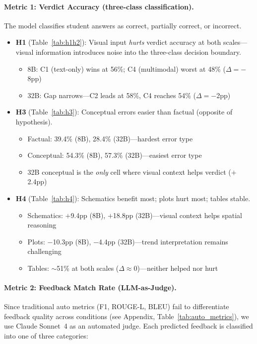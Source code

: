 \documentclass{article} %
\begin{document}
\paragraph{Metric 1: Verdict Accuracy (three-class classification).}
The model classifies student answers as correct, partially correct, or incorrect.

\begin{itemize}[itemsep=2pt, topsep=2pt]
    \item \textbf{H1} (Table~\ref{tab:h1h2}): Visual input \textit{hurts} verdict accuracy at both scales---visual information introduces noise into the three-class decision boundary.
    \begin{itemize}[itemsep=1pt, topsep=1pt]
        \item 8B: C1 (text-only) wins at 56\%; C4 (multimodal) worst at 48\% ($\Delta{=}-$8pp)
        \item 32B: Gap narrows---C2 leads at 58\%, C4 reaches 54\% ($\Delta{=}-$2pp)
    \end{itemize}
    \item \textbf{H3} (Table~\ref{tab:h3}): Conceptual errors easier than factual (opposite of hypothesis).
    \begin{itemize}[itemsep=1pt, topsep=1pt]
        \item Factual: 39.4\% (8B), 28.4\% (32B)---hardest error type
        \item Conceptual: 54.3\% (8B), 57.3\% (32B)---easiest error type
        \item 32B conceptual is the \textit{only} cell where visual context helps verdict ($+$2.4pp)
    \end{itemize}
    \item \textbf{H4} (Table~\ref{tab:h4}): Schematics benefit most; plots hurt most; tables stable.
    \begin{itemize}[itemsep=1pt, topsep=1pt]
        \item Schematics: $+$9.4pp (8B), $+$18.8pp (32B)---visual context helps spatial reasoning
        \item Plots: $-$10.3pp (8B), $-$4.4pp (32B)---trend interpretation remains challenging
        \item Tables: ${\sim}$51\% at both scales ($\Delta{\approx}$0)---neither helped nor hurt
    \end{itemize}
\end{itemize}

\paragraph{Metric 2: Feedback Match Rate (LLM-as-Judge).}
Since traditional auto metrics (F1, ROUGE-L, BLEU) fail to differentiate feedback quality across conditions (see Appendix, Table~\ref{tab:auto_metrics}), we use Claude Sonnet~4 as an automated judge. Each predicted feedback is classified into one of three categories:
\end{document}
